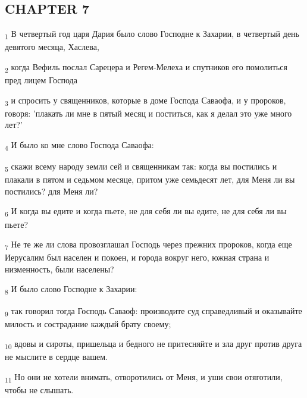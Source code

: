 \subsection{CHAPTER 7}
\begin{tcolorbox}
\textsubscript{1} В четвертый год царя Дария было слово Господне к Захарии, в четвертый день девятого месяца, Хаслева,
\end{tcolorbox}
\begin{tcolorbox}
\textsubscript{2} когда Вефиль послал Сарецера и Регем-Мелеха и спутников его помолиться пред лицем Господа
\end{tcolorbox}
\begin{tcolorbox}
\textsubscript{3} и спросить у священников, которые в доме Господа Саваофа, и у пророков, говоря: 'плакать ли мне в пятый месяц и поститься, как я делал это уже много лет?'
\end{tcolorbox}
\begin{tcolorbox}
\textsubscript{4} И было ко мне слово Господа Саваофа:
\end{tcolorbox}
\begin{tcolorbox}
\textsubscript{5} скажи всему народу земли сей и священникам так: когда вы постились и плакали в пятом и седьмом месяце, притом уже семьдесят лет, для Меня ли вы постились? для Меня ли?
\end{tcolorbox}
\begin{tcolorbox}
\textsubscript{6} И когда вы едите и когда пьете, не для себя ли вы едите, не для себя ли вы пьете?
\end{tcolorbox}
\begin{tcolorbox}
\textsubscript{7} Не те же ли слова провозглашал Господь через прежних пророков, когда еще Иерусалим был населен и покоен, и города вокруг него, южная страна и низменность, были населены?
\end{tcolorbox}
\begin{tcolorbox}
\textsubscript{8} И было слово Господне к Захарии:
\end{tcolorbox}
\begin{tcolorbox}
\textsubscript{9} так говорил тогда Господь Саваоф: производите суд справедливый и оказывайте милость и сострадание каждый брату своему;
\end{tcolorbox}
\begin{tcolorbox}
\textsubscript{10} вдовы и сироты, пришельца и бедного не притесняйте и зла друг против друга не мыслите в сердце вашем.
\end{tcolorbox}
\begin{tcolorbox}
\textsubscript{11} Но они не хотели внимать, отворотились от Меня, и уши свои отяготили, чтобы не слышать.
\end{tcolorbox}
